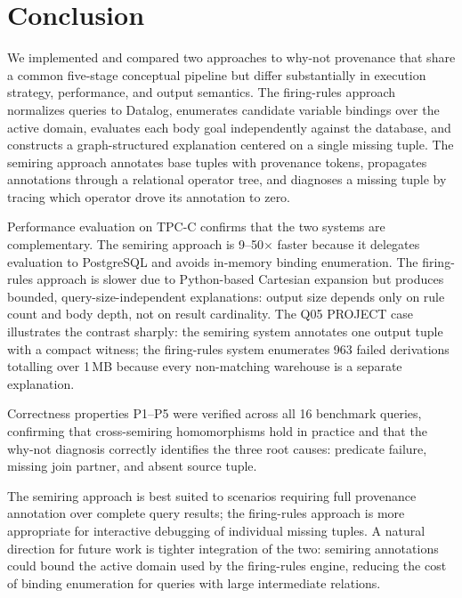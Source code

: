 \documentclass{llncs}
\begin{document}
\section{Conclusion}
\label{sec:conclusion}

We implemented and compared two approaches to why-not provenance that
share a common five-stage conceptual pipeline but differ substantially
in execution strategy, performance, and output semantics.
The firing-rules approach normalizes queries to Datalog, enumerates
candidate variable bindings over the active domain, evaluates each body
goal independently against the database, and constructs a
graph-structured explanation centered on a single missing tuple.
The semiring approach annotates base tuples with provenance tokens,
propagates annotations through a relational operator tree, and diagnoses
a missing tuple by tracing which operator drove its annotation to zero.

Performance evaluation on TPC-C confirms that the two systems are
complementary.
The semiring approach is 9--50$\times$ faster because it delegates
evaluation to PostgreSQL and avoids in-memory binding enumeration.
The firing-rules approach is slower due to Python-based Cartesian
expansion but produces bounded, query-size-independent explanations:
output size depends only on rule count and body depth, not on result
cardinality.
The Q05 PROJECT case illustrates the contrast sharply: the semiring
system annotates one output tuple with a compact witness; the
firing-rules system enumerates 963 failed derivations totalling over
1\,MB because every non-matching warehouse is a separate explanation.

Correctness properties P1--P5 were verified across all 16 benchmark
queries, confirming that cross-semiring homomorphisms hold in practice
and that the why-not diagnosis correctly identifies the three root
causes: predicate failure, missing join partner, and absent source
tuple.

The semiring approach is best suited to scenarios requiring full
provenance annotation over complete query results; the firing-rules
approach is more appropriate for interactive debugging of individual
missing tuples.
A natural direction for future work is tighter integration of the two:
semiring annotations could bound the active domain used by the
firing-rules engine, reducing the cost of binding enumeration for
queries with large intermediate relations.
\end{document}
